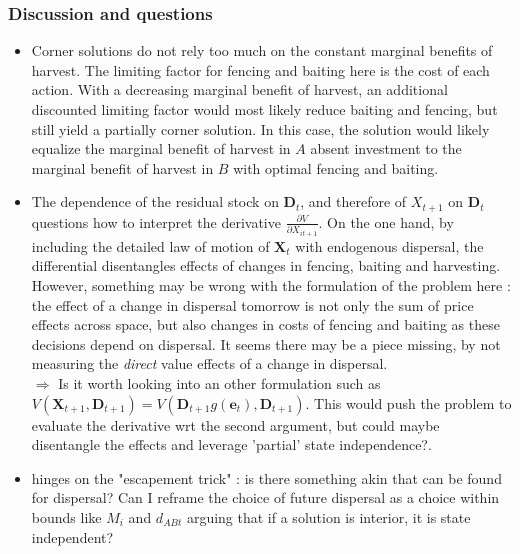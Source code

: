 \documentclass{article}
\begin{document}
\subsubsection{Discussion and questions}
\begin{itemize}
\item Corner solutions do not rely too much on the constant marginal benefits of harvest. The limiting factor for fencing and baiting here is the cost of each action. With a decreasing marginal benefit of harvest, an additional discounted limiting factor would most likely reduce baiting and fencing, but still yield a partially corner solution. In this case, the solution would likely equalize the marginal benefit of harvest in $A$ absent investment to the marginal benefit of harvest in $B$ with optimal fencing and baiting. 

\item The dependence of the residual stock on $\mathbf{D}_t$, and therefore of $X_{t+1}$ on $\mathbf{D}_t$ questions how to interpret the derivative $\frac{\partial V}{\partial X_{it+1}}$. On the one hand, by including the detailed law of motion of $\mathbf{X}_t$ with endogenous dispersal, the differential disentangles effects of changes in fencing, baiting and harvesting. However, something may be wrong with the formulation of the problem here : the effect of a change in dispersal tomorrow is not only the sum of price effects across space, but also changes in costs of fencing and baiting as these decisions depend on dispersal. It seems there may be a piece missing, by not measuring the \textit{direct} value effects of a change in dispersal.\\
$\Rightarrow$ Is it worth looking into an other formulation such as $V(\mathbf{X}_{t+1}, \mathbf{D}_{t+1}) = V(\mathbf{D}_{t+1}g(\mathbf{e}_t), \mathbf{D}_{t+1})$. This would push the problem to evaluate the derivative wrt the second argument, but could maybe disentangle the effects and leverage 'partial' state independence?.
\item \cite{costello_optimal_2008} hinges on the "escapement trick" : is there something akin that can be found for dispersal? Can I reframe the choice of future dispersal as a choice within bounds like $M_i$ and $d_{ABt}$ arguing that if a solution is interior, it is state independent? 
\end{itemize}
\end{document}
